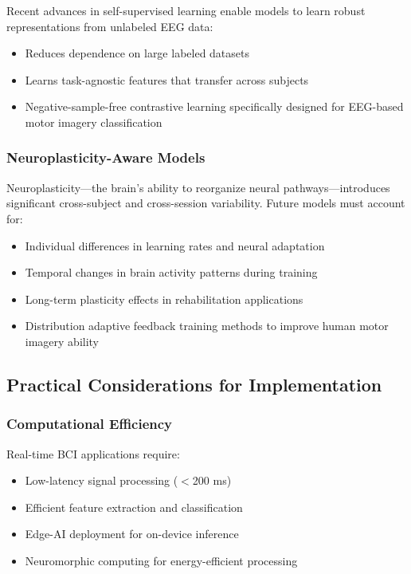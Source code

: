 \documentclass[12pt]{article}
\begin{document}
Recent advances in self-supervised learning enable models to learn robust representations from unlabeled EEG data:
\begin{itemize}
    \item Reduces dependence on large labeled datasets
    \item Learns task-agnostic features that transfer across subjects
    \item Negative-sample-free contrastive learning specifically designed for EEG-based motor imagery classification
\end{itemize}

\subsubsection{Neuroplasticity-Aware Models}

Neuroplasticity—the brain's ability to reorganize neural pathways—introduces significant cross-subject and cross-session variability. Future models must account for:
\begin{itemize}
    \item Individual differences in learning rates and neural adaptation
    \item Temporal changes in brain activity patterns during training
    \item Long-term plasticity effects in rehabilitation applications
    \item Distribution adaptive feedback training methods to improve human motor imagery ability
\end{itemize}

\subsection{Practical Considerations for Implementation}

\subsubsection{Computational Efficiency}

Real-time BCI applications require:
\begin{itemize}
    \item Low-latency signal processing ($<$200 ms)
    \item Efficient feature extraction and classification
    \item Edge-AI deployment for on-device inference
    \item Neuromorphic computing for energy-efficient processing
\end{itemize}
\end{document}
